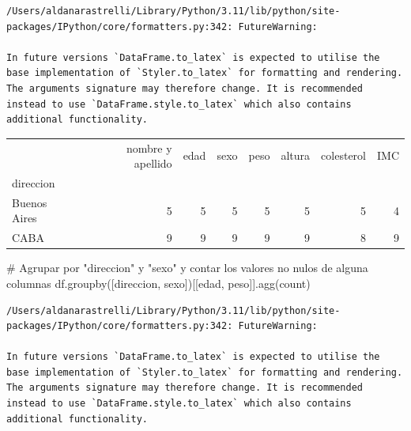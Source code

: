 \documentclass[
  letterpaper,
  DIV=11,
  numbers=noendperiod]{scrreprt}
\newenvironment{Shaded}{\begin{snugshade}}{\end{snugshade}}
\newcommand{\CommentTok}[1]{\textcolor[rgb]{0.37,0.37,0.37}{#1}}
\newcommand{\NormalTok}[1]{\textcolor[rgb]{0.00,0.23,0.31}{#1}}
\newcommand{\StringTok}[1]{\textcolor[rgb]{0.13,0.47,0.30}{#1}}
\begin{document}
\begin{verbatim}
/Users/aldanarastrelli/Library/Python/3.11/lib/python/site-packages/IPython/core/formatters.py:342: FutureWarning:

In future versions `DataFrame.to_latex` is expected to utilise the base implementation of `Styler.to_latex` for formatting and rendering. The arguments signature may therefore change. It is recommended instead to use `DataFrame.style.to_latex` which also contains additional functionality.
\end{verbatim}

\begin{tabular}{lrrrrrrr}
\toprule
{} &  nombre y apellido &  edad &  sexo &  peso &  altura &  colesterol &  IMC \\
direccion    &                    &       &       &       &         &             &      \\
\midrule
Buenos Aires &                  5 &     5 &     5 &     5 &       5 &           5 &    4 \\
CABA         &                  9 &     9 &     9 &     9 &       9 &           8 &    9 \\
\bottomrule
\end{tabular}

\begin{Shaded}
\begin{Highlighting}[]
\CommentTok{\# Agrupar por "direccion" y "sexo" y contar los valores no nulos de alguna columnas}
\NormalTok{df.groupby([}\StringTok{\textquotesingle{}direccion\textquotesingle{}}\NormalTok{, }\StringTok{\textquotesingle{}sexo\textquotesingle{}}\NormalTok{])[[}\StringTok{\textquotesingle{}edad\textquotesingle{}}\NormalTok{, }\StringTok{\textquotesingle{}peso\textquotesingle{}}\NormalTok{]].agg(}\StringTok{\textquotesingle{}count\textquotesingle{}}\NormalTok{)}
\end{Highlighting}
\end{Shaded}

\begin{verbatim}
/Users/aldanarastrelli/Library/Python/3.11/lib/python/site-packages/IPython/core/formatters.py:342: FutureWarning:

In future versions `DataFrame.to_latex` is expected to utilise the base implementation of `Styler.to_latex` for formatting and rendering. The arguments signature may therefore change. It is recommended instead to use `DataFrame.style.to_latex` which also contains additional functionality.
\end{verbatim}
\end{document}
